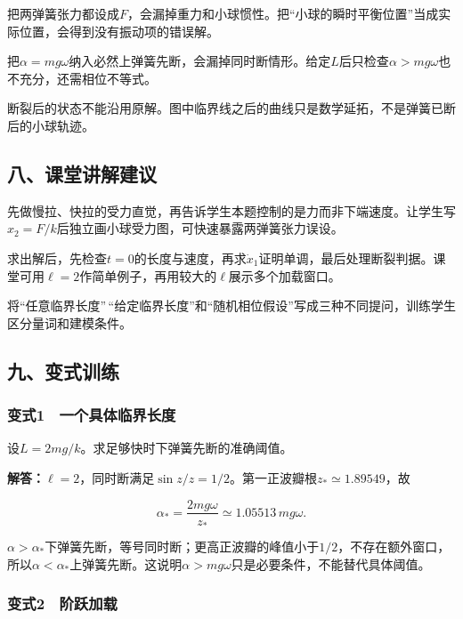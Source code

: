 \documentclass[12pt,a4paper,fontset=fandol]{ctexart}
\begin{document}
把两弹簧张力都设成\(F\)，会漏掉重力和小球惯性。把``小球的瞬时平衡位置''当成实际位置，会得到没有振动项的错误解。

把\(\alpha=mg\omega\)纳入必然上弹簧先断，会漏掉同时断情形。给定\(L\)后只检查\(\alpha>mg\omega\)也不充分，还需相位不等式。

断裂后的状态不能沿用原解。图中临界线之后的曲线只是数学延拓，不是弹簧已断后的小球轨迹。

\subsection{八、课堂讲解建议}\label{ux516bux8bfeux5802ux8bb2ux89e3ux5efaux8bae-4}

先做慢拉、快拉的受力直觉，再告诉学生本题控制的是力而非下端速度。让学生写\(x_2=F/k\)后独立画小球受力图，可快速暴露两弹簧张力误设。

求出解后，先检查\(t=0\)的长度与速度，再求\(\dot x_1\)证明单调，最后处理断裂判据。课堂可用\(\ell=2\)作简单例子，再用较大的\(\ell\)展示多个加载窗口。

将``任意临界长度''\,``给定临界长度''和``随机相位假设''写成三种不同提问，训练学生区分量词和建模条件。

\subsection{九、变式训练}\label{ux4e5dux53d8ux5f0fux8badux7ec3-4}

\subsubsection{变式1　一个具体临界长度}\label{ux53d8ux5f0f1-ux4e00ux4e2aux5177ux4f53ux4e34ux754cux957fux5ea6}

设\(L=2mg/k\)。求足够快时下弹簧先断的准确阈值。

\textbf{解答：}\(\ell=2\)，同时断满足\(\sin z/z=1/2\)。第一正波瓣根\(z_*\simeq1.89549\)，故

\[
\alpha_*=\frac{2mg\omega}{z_*}\simeq1.05513\,mg\omega.
\]

\(\alpha>\alpha_*\)下弹簧先断，等号同时断；更高正波瓣的峰值小于\(1/2\)，不存在额外窗口，所以\(\alpha<\alpha_*\)上弹簧先断。这说明\(\alpha>mg\omega\)只是必要条件，不能替代具体阈值。

\subsubsection{变式2　阶跃加载}\label{ux53d8ux5f0f2-ux9636ux8dc3ux52a0ux8f7d}
\end{document}
